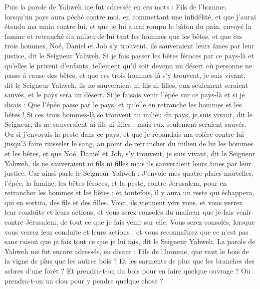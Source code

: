 \begin{multicols}{2}
Puis la parole de Yahweh me fut adressée en ces mots :
Fils de l'homme, lorsqu'un pays aura péché contre moi, en commettant une infidélité, et que j'aurai étendu ma main contre lui, et que je lui aurai rompu le bâton du pain, envoyé la famine et retranché du milieu de lui tant les hommes que les bêtes,
et que ces trois hommes, Noé, Daniel et Job s'y trouvent, ils sauveraient leurs âmes par leur justice, dit le Seigneur Yahweh.
Si je fais passer les bêtes féroces par ce pays-là et qu'elles le privent d'enfants, tellement qu'il soit devenu un désert où personne ne passe à cause des bêtes,
et que ces trois hommes-là s'y trouvent, je suis vivant, dit le Seigneur Yahweh, ils ne sauveraient ni fils ni filles, eux seulement seraient sauvés, et le pays sera un désert.
Si je faisais venir l'épée sur ce pays-là et si je disais : Que l'épée passe par le pays, et qu'elle en retranche les hommes et les bêtes !
Si ces trois hommes-là se trouvent au milieu du pays, je suis vivant, dit le Seigneur, ils ne sauveraient ni fils ni filles ; mais eux seulement seraient sauvés.
Ou si j'envoyais la peste dans ce pays, et que je répandais ma colère contre lui jusqu'à faire ruisseler le sang, au point de retrancher du milieu de lui les hommes et les bêtes,
et que Noé, Daniel et Job, s'y trouvent, je suis vivant, dit le Seigneur Yahweh, ils ne sauveraient ni fils ni filles mais ils sauveraient leurs âmes par leur justice.
Car ainsi parle le Seigneur Yahweh : J'envoie mes quatre plaies mortelles, l'épée, la famine, les bêtes féroces, et la peste, contre Jérusalem, pour en retrancher les hommes et les bêtes ;
et toutefois, il y aura un reste qui échappera, qui en sortira, des fils et des filles. Voici, ils viennent vers vous, et vous verrez leur conduite et leurs actions, et vous serez consolés du malheur que je fais venir contre Jérusalem, de tout ce que je fais venir sur elle.
Vous serez consolés, lorsque vous verrez leur conduite et leurs actions ; et vous reconnaîtrez que ce n'est pas sans raison que je fais tout ce que je lui fais, dit le Seigneur Yahweh.
\VerseOne{}La parole de Yahweh me fut encore adressée, en disant :
Fils de l'homme, que vaut le bois de la vigne de plus que les autres bois ? Et les sarments de plus que les branches des arbres d'une forêt ?
Et prendra-t-on du bois pour en faire quelque ouvrage ? Ou prendra-t-on un clou pour y pendre quelque chose ?

\end{multicols}
